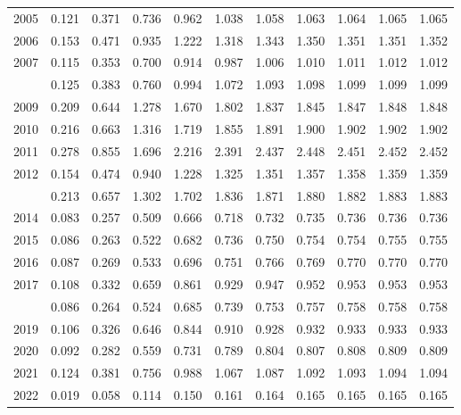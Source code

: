 \documentclass[
]{article}
\begin{document}
\begin{longtable}[t]{lrrrrrrrrrr}
2005 & 0.121 & 0.371 & 0.736 & 0.962 & 1.038 & 1.058 & 1.063 & 1.064 & 1.065 & 1.065\\
2006 & 0.153 & 0.471 & 0.935 & 1.222 & 1.318 & 1.343 & 1.350 & 1.351 & 1.351 & 1.352\\
2007 & 0.115 & 0.353 & 0.700 & 0.914 & 0.987 & 1.006 & 1.010 & 1.011 & 1.012 & 1.012\\
\addlinespace
2008 & 0.125 & 0.383 & 0.760 & 0.994 & 1.072 & 1.093 & 1.098 & 1.099 & 1.099 & 1.099\\
2009 & 0.209 & 0.644 & 1.278 & 1.670 & 1.802 & 1.837 & 1.845 & 1.847 & 1.848 & 1.848\\
2010 & 0.216 & 0.663 & 1.316 & 1.719 & 1.855 & 1.891 & 1.900 & 1.902 & 1.902 & 1.902\\
2011 & 0.278 & 0.855 & 1.696 & 2.216 & 2.391 & 2.437 & 2.448 & 2.451 & 2.452 & 2.452\\
2012 & 0.154 & 0.474 & 0.940 & 1.228 & 1.325 & 1.351 & 1.357 & 1.358 & 1.359 & 1.359\\
\addlinespace
2013 & 0.213 & 0.657 & 1.302 & 1.702 & 1.836 & 1.871 & 1.880 & 1.882 & 1.883 & 1.883\\
2014 & 0.083 & 0.257 & 0.509 & 0.666 & 0.718 & 0.732 & 0.735 & 0.736 & 0.736 & 0.736\\
2015 & 0.086 & 0.263 & 0.522 & 0.682 & 0.736 & 0.750 & 0.754 & 0.754 & 0.755 & 0.755\\
2016 & 0.087 & 0.269 & 0.533 & 0.696 & 0.751 & 0.766 & 0.769 & 0.770 & 0.770 & 0.770\\
2017 & 0.108 & 0.332 & 0.659 & 0.861 & 0.929 & 0.947 & 0.952 & 0.953 & 0.953 & 0.953\\
\addlinespace
2018 & 0.086 & 0.264 & 0.524 & 0.685 & 0.739 & 0.753 & 0.757 & 0.758 & 0.758 & 0.758\\
2019 & 0.106 & 0.326 & 0.646 & 0.844 & 0.910 & 0.928 & 0.932 & 0.933 & 0.933 & 0.933\\
2020 & 0.092 & 0.282 & 0.559 & 0.731 & 0.789 & 0.804 & 0.807 & 0.808 & 0.809 & 0.809\\
2021 & 0.124 & 0.381 & 0.756 & 0.988 & 1.067 & 1.087 & 1.092 & 1.093 & 1.094 & 1.094\\
2022 & 0.019 & 0.058 & 0.114 & 0.150 & 0.161 & 0.164 & 0.165 & 0.165 & 0.165 & 0.165\\*
\end{longtable}
\end{document}
